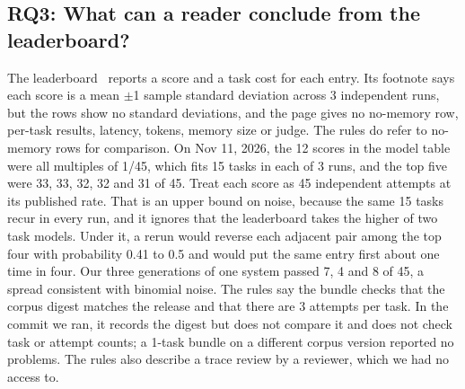 \subsection{RQ3: What can a reader conclude from the leaderboard?}
The leaderboard~\cite{frontiermemory} reports a score and a task cost for each entry. Its footnote says each score is a mean $\pm$1 sample standard deviation across 3 independent runs, but the rows show no standard deviations, and the page gives no no-memory row, per-task results, latency, tokens, memory size or judge. The rules do refer to no-memory rows for comparison.
On Nov 11, 2026, the 12 scores in the model table were all multiples of 1/45, which fits 15 tasks in each of 3 runs, and the top five were 33, 33, 32, 32 and 31 of 45. Treat each score as 45 independent attempts at its published rate. That is an upper bound on noise, because the same 15 tasks recur in every run, and it ignores that the leaderboard takes the higher of two task models. Under it, a rerun would reverse each adjacent pair among the top four with probability 0.41 to 0.5 and would put the same entry first about one time in four. Our three generations of one system passed 7, 4 and 8 of 45, a spread consistent with binomial noise.
The rules say the bundle checks that the corpus digest matches the release and that there are 3 attempts per task. In the commit we ran, it records the digest but does not compare it and does not check task or attempt counts; a 1-task bundle on a different corpus version reported no problems. The rules also describe a trace review by a reviewer, which we had no access to.
